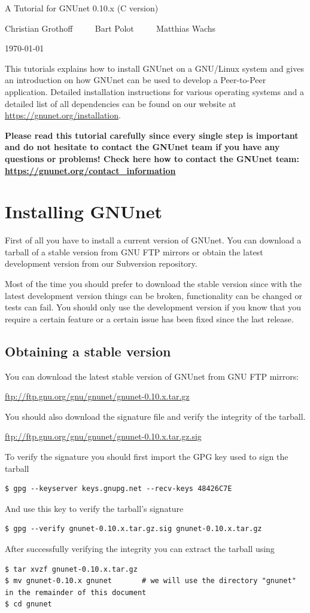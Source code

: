 \documentclass[10pt]{article}
\begin{document}
\begin{center}
\large {A Tutorial for GNUnet 0.10.x (C version)}

Christian Grothoff $\qquad$ Bart Polot $\qquad$ Matthias Wachs

\today
\end{center}
This tutorials explains how to install GNUnet on a GNU/Linux system and gives an introduction on how
GNUnet can be used to develop a Peer-to-Peer application. Detailed installation instructions for
various operating systems and a detailed list of all dependencies can be found on our website at
\url{https://gnunet.org/installation}.

\textbf{Please read this tutorial carefully since every single step is
  important and do not hesitate to contact the GNUnet team if you have
  any questions or problems! Check here how to contact the GNUnet
  team: \url{https://gnunet.org/contact_information}}


\section{Installing GNUnet}
First of all you have to install a current version of GNUnet. You can download a
tarball of a stable version from GNU FTP mirrors or obtain the latest development
version from our Subversion repository.

Most of the time you should prefer to download the stable version since with the
latest development version things can be broken, functionality can be changed or tests
can fail. You should only use the development version if you know that you require a
certain feature or a certain issue has been fixed since the last release.

\subsection{Obtaining a stable version}
You can download the latest stable version of GNUnet from GNU FTP mirrors:
\begin{center}
\url{ftp://ftp.gnu.org/gnu/gnunet/gnunet-0.10.x.tar.gz}
\end{center}
You should also download the signature file and verify the integrity of the tarball.
\begin{center}
\url{ftp://ftp.gnu.org/gnu/gnunet/gnunet-0.10.x.tar.gz.sig}
\end{center}
To verify the signature you should first import the GPG key used to sign the tarball
\begin{lstlisting}
$ gpg --keyserver keys.gnupg.net --recv-keys 48426C7E
\end{lstlisting}
And use this key to verify the tarball's signature
\begin{lstlisting}
$ gpg --verify gnunet-0.10.x.tar.gz.sig gnunet-0.10.x.tar.gz
\end{lstlisting}
After successfully verifying the integrity you can extract the tarball using
\begin{lstlisting}
$ tar xvzf gnunet-0.10.x.tar.gz
$ mv gnunet-0.10.x gnunet		# we will use the directory "gnunet" in the remainder of this document
$ cd gnunet
\end{lstlisting}
\end{document}
